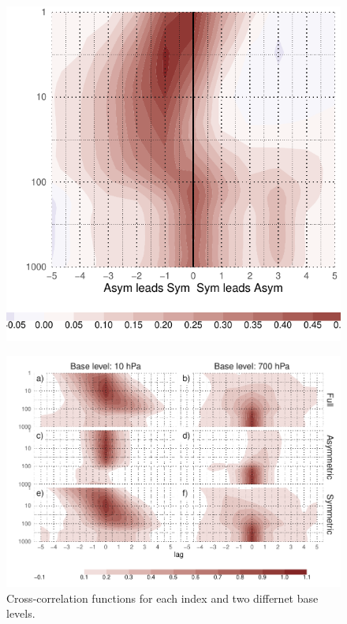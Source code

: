 \documentclass[]{ametsocV5}
\begin{document}

\begin{figure}
\includegraphics{A1-1} \label{fig:A1}
\end{figure}

\begin{figure}
\includegraphics{A2 ccf-levels-1} \caption[Cross-correlation functions for each index and two differnet base levels]{Cross-correlation functions for each index and two differnet base levels.}\label{fig:A2 ccf-levels}
\end{figure}
\end{document}
